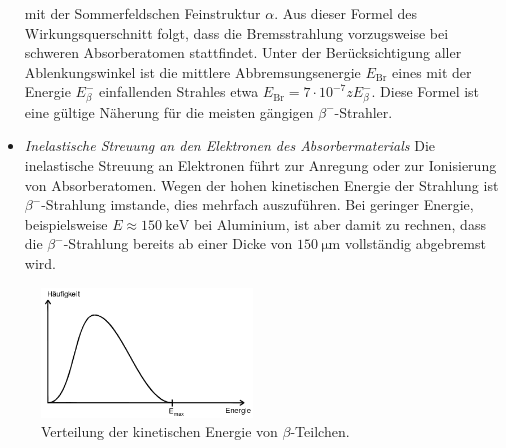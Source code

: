 \begin{itemize}
{mit der Sommerfeldschen Feinstruktur $\alpha$.
Aus dieser Formel des Wirkungsquerschnitt folgt, dass die Bremsstrahlung vorzugsweise bei schweren Absorberatomen stattfindet.
Unter der Berücksichtigung aller Ablenkungswinkel ist die mittlere Abbremsungsenergie $E_\text{Br}$ eines mit der Energie $E_\beta^-$ einfallenden Strahles etwa $E_\text{Br} = 7\cdot10^{-7}zE_\beta^-$.
Diese Formel ist eine gültige Näherung für die meisten gängigen $\beta^-$-Strahler.
}
	\item{\emph{Inelastische Streuung an den Elektronen des Absorbermaterials}
Die inelastische Streuung an Elektronen führt zur Anregung oder zur Ionisierung von Absorberatomen.
Wegen der hohen kinetischen Energie der Strahlung ist $\beta^-$-Strahlung imstande, dies mehrfach auszuführen.
Bei geringer Energie, beispielsweise $E\approx\SI{150}{\kilo\electronvolt}$ bei Aluminium, ist aber damit zu rechnen, 
dass die $\beta^-$-Strahlung bereits ab einer Dicke von $\SI{150}{\micro\meter}$ vollständig abgebremst wird.
}
\end{itemize}


\begin{figure}[hbp]
	\centering
	\includegraphics[width=0.5\textwidth]{Bilder/beta.png}
	\caption{Verteilung der kinetischen Energie von \texorpdfstring{$\beta$}{Beta}-Teilchen.\cite{skript}}
	\label{fig:energieElektron}
\end{figure}

